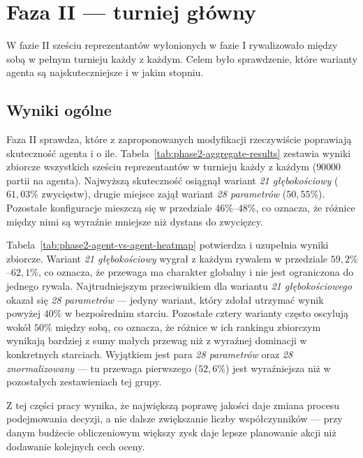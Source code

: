 \section{Faza II — turniej główny}
\label{sec:phase2}

W fazie II sześciu reprezentantów wyłonionych w fazie I rywalizowało między sobą w pełnym turnieju każdy z każdym. Celem było sprawdzenie, które warianty agenta są najskuteczniejsze i w jakim stopniu.

\subsection{Wyniki ogólne}

Faza II sprawdza, które z zaproponowanych modyfikacji rzeczywiście poprawiają skuteczność agenta i o ile. Tabela~\ref{tab:phase2-aggregate-results} zestawia wyniki zbiorcze wszystkich sześciu reprezentantów w turnieju każdy z każdym (\(90 000\) partii na agenta). Najwyższą skuteczność osiągnął wariant \textit{21 głębokościowy} (\(61{,}03\%\) zwycięstw), drugie miejsce zajął wariant \textit{28 parametrów} (\(50{,}55\%\)). Pozostałe konfiguracje mieszczą się w przedziale \(46\%\)--\(48\%\), co oznacza, że różnice między nimi są wyraźnie mniejsze niż dystans do zwycięzcy.





Tabela~\ref{tab:phase2-agent-vs-agent-heatmap} potwierdza i uzupełnia wyniki zbiorcze. Wariant \textit{21 głębokościowy} wygrał z każdym rywalem w przedziale \(59{,}2\%\)--\(62{,}1\%\), co oznacza, że przewaga ma charakter globalny i nie jest ograniczona do jednego rywala. Najtrudniejszym przeciwnikiem dla wariantu \textit{21 głębokościowego} okazał się \textit{28 parametrów} --- jedyny wariant, który zdołał utrzymać wynik powyżej \(40\%\) w bezpośrednim starciu. Pozostałe cztery warianty często oscylują wokół \(50\%\) między sobą, co oznacza, że różnice w ich rankingu zbiorczym wynikają bardziej z sumy małych przewag niż z wyraźnej dominacji w konkretnych starciach. Wyjątkiem jest para \textit{28 parametrów} oraz \textit{28 znormalizowany} --- tu przewaga pierwszego (\(52{,}6\%\)) jest wyraźniejsza niż w pozostałych zestawieniach tej grupy.

Z tej części pracy wynika, że największą poprawę jakości daje zmiana procesu podejmowania decyzji, a nie dalsze zwiększanie liczby współczynników --- przy danym budżecie obliczeniowym większy zysk daje lepsze planowanie akcji niż dodawanie kolejnych cech oceny.

